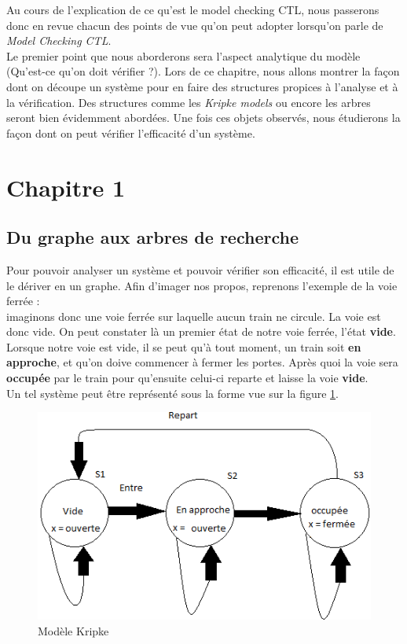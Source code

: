 \documentclass[runningheads,a4paper]{llncs}
\begin{document}
\noindent Au cours de l'explication de ce qu'est le model checking CTL, nous passerons donc en revue chacun des points de vue qu'on peut adopter lorsqu'on parle de \textit{Model Checking CTL}.\\
Le premier point que nous aborderons sera l'aspect analytique du modèle (Qu'est-ce qu'on doit vérifier ?). Lors de ce chapitre, nous allons montrer la façon dont on découpe un système pour en faire des structures propices à l'analyse et à la vérification. Des structures comme les \textit{Kripke models} ou encore les arbres seront bien évidemment abordées. Une fois ces objets observés, nous étudierons la façon dont on peut vérifier l'efficacité d'un système.


\section{Chapitre 1}
\subsection{Du graphe aux arbres de recherche}

Pour pouvoir analyser un système et pouvoir vérifier son efficacité, il est utile de le dériver en un graphe. Afin d'imager nos propos, reprenons l'exemple de la voie ferrée :\\ imaginons donc une voie ferrée sur laquelle aucun train ne circule. La voie est donc vide. On peut constater là un premier état de notre voie ferrée, l'état \textbf{vide}. Lorsque notre voie est vide, il se peut qu'à tout moment, un train soit \textbf{en approche}, et qu'on doive commencer à fermer les portes. Après quoi la voie sera \textbf{occupée} par le train pour qu'ensuite celui-ci reparte et laisse la voie \textbf{vide}.\\

\noindent Un tel système peut être représenté sous la forme vue sur la figure  \ref{label-image3}.

\begin{figure}[!h]
	\includegraphics[scale=0.5]{graphe.png}
	\centering
	\caption{Modèle Kripke}
	\label{label-image3}
\end{figure}
\end{document}
